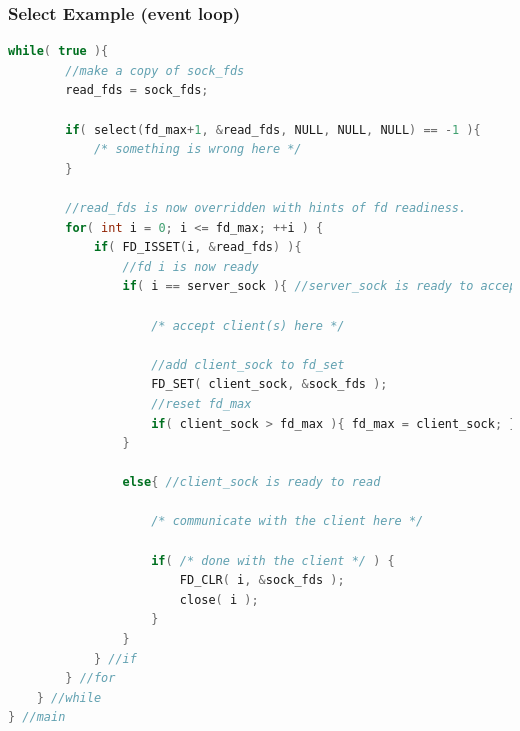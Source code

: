 \documentclass[aspectratio=43]{beamer}
\begin{document}
\begin{frame}[fragile]
  \frametitle{Select Example (event loop) }
 \begin{lstlisting}[language=C++,basicstyle=\ttfamily\tiny,commentstyle=\color{commgreen},keywordstyle=\color{blue},breaklines=true]
    while( true ){
        //make a copy of sock_fds
        read_fds = sock_fds;
        
        if( select(fd_max+1, &read_fds, NULL, NULL, NULL) == -1 ){
            /* something is wrong here */
        }
        
        //read_fds is now overridden with hints of fd readiness.
        for( int i = 0; i <= fd_max; ++i ) {
            if( FD_ISSET(i, &read_fds) ){
                //fd i is now ready
                if( i == server_sock ){ //server_sock is ready to accept
                    
                    /* accept client(s) here */
                    
                    //add client_sock to fd_set
                    FD_SET( client_sock, &sock_fds );
                    //reset fd_max
                    if( client_sock > fd_max ){ fd_max = client_sock; }
                }
                
                else{ //client_sock is ready to read
                   
                    /* communicate with the client here */
                
                    if( /* done with the client */ ) {
                        FD_CLR( i, &sock_fds ); 
                        close( i );
                    }
                }
            } //if
        } //for
    } //while
} //main
       \end{lstlisting}
\end{frame}
\end{document}

